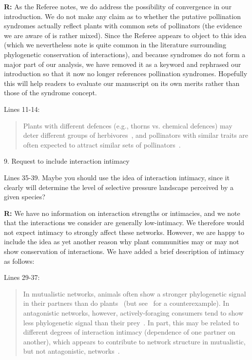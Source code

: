 \documentclass[12pt]{letter}
\newenvironment{refquote}{\bigskip \begin{it}}{\end{it}\smallskip}
\begin{document}
		\textbf{R:} As the Referee notes, we do address the possibility of convergence in our introduction. We do not make any claim as to whether the putative pollination syndromes actually reflect plants with common sets of pollinators (the evidence we are aware of is rather mixed). Since the Referee appears to object to this idea (which we nevertheless note is quite common in the literature surrounding phylogenetic conservation of interactions), and because syndromes do not form a major part of our analysis, we have removed it as a keyword and rephrased our introduction so that it now no longer references pollination syndromes. Hopefully this will help readers to evaluate our manuscript on its own merits rather than those of the syndrome concept.


		Lines 11-14:

		\begin{quotation}

			Plants with different defences 
		  	(e.g., thorns vs. chemical defences) may deter different groups of 
		  	herbivores~\citep{Ehrlich1964,Johnson2014}, and pollinators with similar traits are often expected to attract similar sets of pollinators~\citep{Waser1996,Fenster2004,Ollerton2009}.

		\end{quotation}


	9. Request to include interaction intimacy

		\begin{refquote}
		Lines 35-39. Maybe you should use the idea of interaction intimacy, since it clearly will determine the level of selective pressure landscape perceived by a given species?
		\end{refquote}


		\textbf{R:} We have no information on interaction strengths or intimacies, and we note that the interactions we consider are generally low-intimacy. We therefore would not expect intimacy to strongly affect these networks. However, we are happy to include the idea as yet another reason why plant communities may or may not show conservation of interactions. We have added a brief description of intimacy as follows:


		Lines 29-37:

		\begin{quotation}

			In mutualistic networks, animals often show a stronger phylogenetic signal in their partners than do plants~\citep{Rezende2007a,Chamberlain2014,Rohr2014,Vamosi2014,Lind2015,Fontaine2015} (but see~\citet{Rafferty2013} for a counterexample). In antagonistic networks, however, actively-foraging consumers tend to show less phylogenetic signal than their prey~\citep{Ives2006,Cagnolo2011,Naisbit2011,Fontaine2015}. In part, this may be related to different degrees of interaction intimacy (dependence of one partner on another), which appears to contribute to network structure in mutualistic, but not antagonistic, networks~\citep{Guimaraes2007,Ponisio2017}. 

		\end{quotation}
\end{document}
